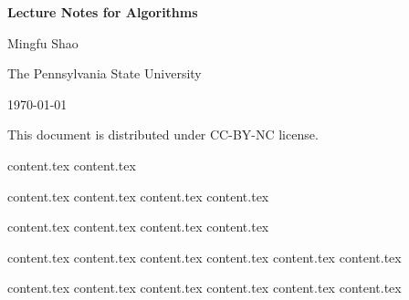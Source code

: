 \documentclass[letterpaper,11pt]{article}
\theoremstyle{mytheorem}
\begin{document}

\thispagestyle{titlestyle}
\begin{center}
\vspace*{4cm} {\Huge \bf Lecture Notes for Algorithms } \vspace*{2cm}

{\Large  Mingfu Shao}

{\Large  The Pennsylvania State University}

{\Large  \today}

\vspace*{8cm}

{\large This document is distributed under CC-BY-NC license.}
\end{center}

\clearpage \newpage


\makeatletter
\renewcommand{\l@section}{\@dottedtocline{1}{0em}{5em}}
\makeatother

\thispagestyle{tablestyle}
\tableofcontents \thispagestyle{tablestyle} \clearpage \newpage

{content.tex} \clearpage\newpage
{content.tex} \clearpage\newpage

{content.tex} \clearpage\newpage
{content.tex} \clearpage\newpage
{content.tex} \clearpage\newpage
{content.tex} \clearpage\newpage

{content.tex} \clearpage\newpage
{content.tex} \clearpage\newpage
{content.tex} \clearpage\newpage
{content.tex} \clearpage\newpage

{content.tex} \clearpage\newpage
{content.tex} \clearpage\newpage
{content.tex} \clearpage\newpage
{content.tex} \clearpage\newpage
{content.tex} \clearpage\newpage
{content.tex} \clearpage\newpage

{content.tex} \clearpage\newpage
{content.tex} \clearpage\newpage
{content.tex} \clearpage\newpage
{content.tex} \clearpage\newpage
{content.tex} \clearpage\newpage
{content.tex} \clearpage\newpage
\end{document}
